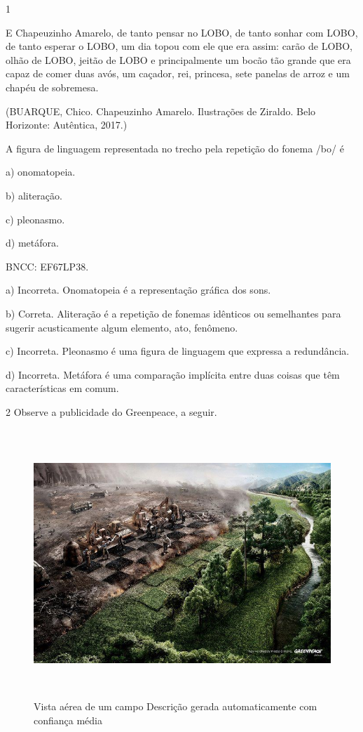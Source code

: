 {

\num{1}

E Chapeuzinho Amarelo, de tanto pensar no LOBO, de tanto sonhar com
LOBO, de tanto esperar o LOBO, um dia topou com ele que era assim: carão
de LOBO, olhão de LOBO, jeitão de LOBO e principalmente um bocão tão
grande que era capaz de comer duas avós, um caçador, rei, princesa, sete
panelas de arroz e um chapéu de sobremesa.

(BUARQUE, Chico. Chapeuzinho Amarelo. Ilustrações de Ziraldo. Belo
Horizonte: Autêntica, 2017.)

A figura de linguagem representada no trecho pela repetição do fonema
/bo/ é

a) onomatopeia.

b) aliteração.

c) pleonasmo.

d) metáfora.

BNCC: EF67LP38.

a) Incorreta. Onomatopeia é a representação gráfica dos sons.

b) Correta. Aliteração é a repetição de fonemas idênticos ou semelhantes
para sugerir acusticamente algum elemento, ato, fenômeno.

c) Incorreta. Pleonasmo é uma figura de linguagem que expressa a
redundância.

d) Incorreta. Metáfora é uma comparação implícita entre duas coisas que
têm características em comum.

\num{2} Observe a publicidade do Greenpeace, a seguir.

\begin{figure}
\centering
\includegraphics[width=5.90556in,height=3.97222in]{./imgSAEB_6_POR/media/image29.jpeg}
\caption{Vista aérea de um campo Descrição gerada automaticamente com
confiança média}
\end{figure}

}
